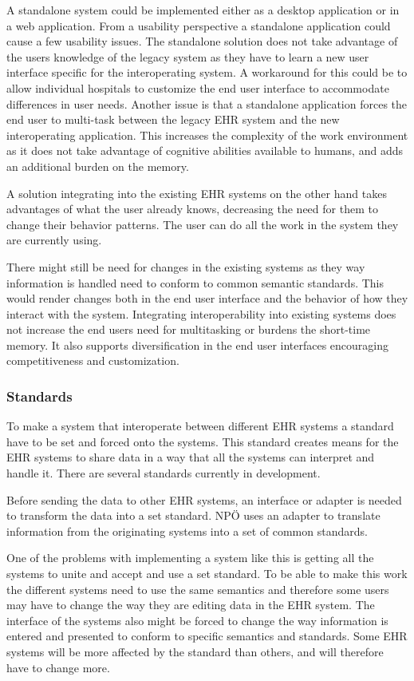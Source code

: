 \documentclass[14pt]{article}
\begin{document}
A standalone system could be implemented either as a desktop application or in a web application. From a usability perspective a standalone application could cause a few usability issues. The standalone solution does not take advantage of the users knowledge of the legacy system as they have to learn a new user interface specific for the interoperating system. A workaround for this could be to allow individual hospitals to customize the end user interface to accommodate differences in user needs. 
Another issue is that a standalone application forces the end user to multi-task between the legacy \gls{EHR} system and the new interoperating application. This increases the complexity of the work environment as it does not take advantage of cognitive abilities available to humans, and adds an additional burden on the memory. 

A solution integrating into the existing \gls{EHR} systems on the other hand takes advantages of what the user already knows, decreasing the need for them to change their behavior patterns. The user can do all the work in the system they are currently using.

There might still be need for changes in the existing systems as they way information is handled need to conform to common semantic standards. This would render changes both in the end user interface and the behavior of how they interact with the system. Integrating interoperability into existing systems does not increase the end users need for multitasking or burdens the short-time memory. It also supports diversification in the end user interfaces encouraging competitiveness and customization.

\subsubsection{Standards}
\label{sec:resultsStandards}
To make a system that interoperate between different \gls{EHR} systems a standard have to be set and forced onto the systems. This standard creates means for the \gls{EHR} systems to share data in a way that all the systems can interpret and handle it. There are several standards currently in development.

Before sending the data to other \gls{EHR} systems, an interface or adapter is needed to transform the data into a set standard. NPÖ uses an adapter to translate information from the originating systems into a set of common standards. 

One of the problems with implementing a system like this is getting all the systems to unite and accept and use a set standard. To be able to make this work the different systems need to use the same semantics and therefore some users may have to change the way they are editing data in the \gls{EHR} system. The interface of the systems also might be forced to change the way information is entered and presented to conform to specific semantics and standards. Some \gls{EHR} systems will be more affected by the standard than others, and will therefore have to change more.
\end{document}
